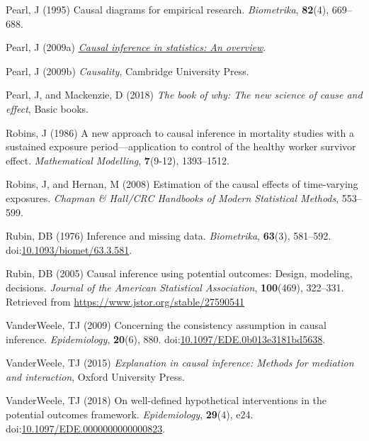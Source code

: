 \documentclass[
  singlecolumn]{article}
\newlength{\cslhangindent}
\newenvironment{CSLReferences}[2] %
 {\begin{list}{}{%
  \setlength{\itemindent}{0pt}
  \setlength{\leftmargin}{0pt}
  \setlength{\parsep}{0pt}
  \ifodd #1
   \setlength{\leftmargin}{\cslhangindent}
   \setlength{\itemindent}{-1\cslhangindent}
  \fi
  \setlength{\itemsep}{#2\baselineskip}}}
 {\end{list}}
\begin{document}
\begin{CSLReferences}{1}{0}
Pearl, J (1995) Causal diagrams for empirical research.
\emph{Biometrika}, \textbf{82}(4), 669--688.

Pearl, J (2009a) \emph{\href{https://doi.org/10.1214/09-SS057}{Causal
inference in statistics: An overview}}.

Pearl, J (2009b) \emph{Causality}, Cambridge University Press.

Pearl, J, and Mackenzie, D (2018) \emph{The book of why: The new science
of cause and effect}, Basic books.

Robins, J (1986) A new approach to causal inference in mortality studies
with a sustained exposure period---application to control of the healthy
worker survivor effect. \emph{Mathematical Modelling}, \textbf{7}(9-12),
1393--1512.

Robins, J, and Hernan, M (2008) Estimation of the causal effects of
time-varying exposures. \emph{Chapman \& Hall/CRC Handbooks of Modern
Statistical Methods}, 553--599.

Rubin, DB (1976) Inference and missing data. \emph{Biometrika},
\textbf{63}(3), 581--592.
doi:\href{https://doi.org/10.1093/biomet/63.3.581}{10.1093/biomet/63.3.581}.

Rubin, DB (2005) Causal inference using potential outcomes: Design,
modeling, decisions. \emph{Journal of the American Statistical
Association}, \textbf{100}(469), 322--331. Retrieved from
\url{https://www.jstor.org/stable/27590541}

VanderWeele, TJ (2009) Concerning the consistency assumption in causal
inference. \emph{Epidemiology}, \textbf{20}(6), 880.
doi:\href{https://doi.org/10.1097/EDE.0b013e3181bd5638}{10.1097/EDE.0b013e3181bd5638}.

VanderWeele, TJ (2015) \emph{Explanation in causal inference: Methods
for mediation and interaction}, Oxford University Press.

VanderWeele, TJ (2018) On well-defined hypothetical interventions in the
potential outcomes framework. \emph{Epidemiology}, \textbf{29}(4), e24.
doi:\href{https://doi.org/10.1097/EDE.0000000000000823}{10.1097/EDE.0000000000000823}.


\end{CSLReferences}
\end{document}
